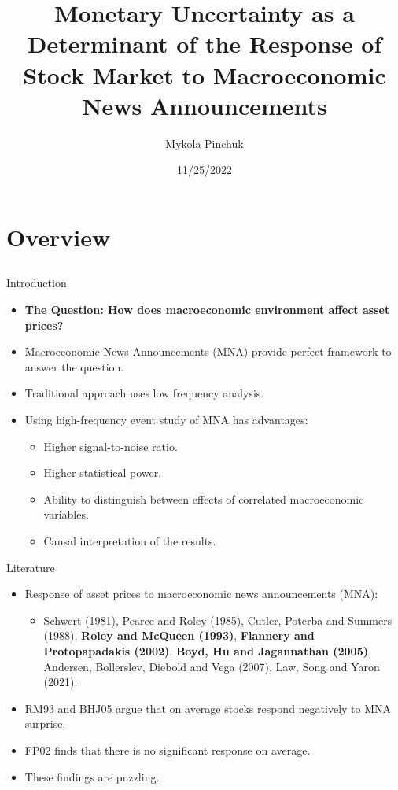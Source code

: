 \documentclass{beamer}
\title[Monetary Uncertainty as a Determinant of the Response of Stock Market to MNAs]{Monetary Uncertainty as a Determinant of the Response of Stock Market to Macroeconomic News Announcements\\ }
\author{Mykola Pinchuk}
\date{11/25/2022}
\begin{document}
\begin{frame}
  \titlepage
\end{frame}

\section{Overview}
\subsection{}


\begin{frame}{Introduction}
\begin{itemize}
    \item {\textbf{The Question: How does macroeconomic environment affect asset prices?}}
    \item {Macroeconomic News Announcements (MNA) provide perfect framework to answer the question.}    
    \item {Traditional approach uses low frequency analysis.}    
    \item {Using high-frequency event study of MNA has advantages:}
    \begin{itemize}
        \item {Higher signal-to-noise ratio.}
        \item {Higher statistical power.}
        \item {Ability to distinguish between effects of correlated macroeconomic variables.}
        \item {Causal interpretation of the results.}
    \end{itemize}
\end{itemize}
\end{frame}


\begin{frame}{Literature}
\begin{itemize}
    \item {Response of asset prices to macroeconomic news announcements (MNA):}
    \begin{itemize}
        \item {Schwert (1981), Pearce and Roley (1985), Cutler, Poterba and Summers (1988), \textbf{Roley and McQueen (1993)}, \textbf{Flannery and Protopapadakis (2002)}, \textbf{Boyd, Hu and Jagannathan (2005)}, Andersen, Bollerslev, Diebold and Vega (2007), Law, Song and Yaron (2021).}
    \end{itemize}
    \item {RM93 and BHJ05 argue that on average stocks respond negatively to MNA surprise.}
    \item {FP02 finds that there is no significant response on average.}
    \item {These findings are puzzling.}
\end{itemize}
\end{frame}
\end{document}
